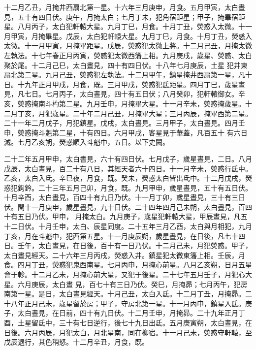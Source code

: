 \begin{pinyinscope}
 十二月乙丑，月掩井西扇北第一星。十六年三月庚申，月食。五月甲寅，太白晝見，五十有四日伏。庚午，月掩太白；七月丁未，犯角宿距星；甲子，掩畢宿距星。八月丙子，太白犯軒轅大星。九月丁巳，月食。十月丁丑，熒惑入太微。十一月甲寅，月掩畢星。戊辰，太白犯軒轅大星。九月丁巳，月食。十月丁丑，熒惑入太微。十一月甲寅，月掩畢距星。戊辰，熒惑犯太微上將。十二月己丑，月掩太微左執法。十七年春正月丙寅，熒惑犯太微西籓上相。九月庚戌，歲星、熒惑、太白聚於尾。十二月己巳，太白晝見，四十有四日伏。十八年七月庚辰，土星
 犯井東扇北第二星。九月己丑，熒惑犯左執法。十二月甲午，鎮星掩井西扇第一星，凡十日。十九年正月甲戌，月食，既。三月甲戌，熒惑犯氐距星。四月丁巳，歲星晝見，凡七日。七月丙子，太白晝見，四十有五日伏；八月癸卯，犯軒轅御女。辛亥，熒惑掩南斗杓第二星。九月壬申，月掩畢大星。十一月辛未，熒惑掩歲星。十二月丁亥，月犯歲星。二十年二月己丑，月掩畢大星；三月丙辰，掩畢西第二星。二十一年二月戊子，月犯鎮星。戊戌，太白晝見。三月甲子，太白晝見。四月壬申，熒惑掩斗魁第二星，十有四日。六月甲戌，客星見于華蓋，凡百五十
 有六日滅。七月乙亥朔，熒惑順入斗魁中，五日。以下史闕。



 二十二年五月甲申，太白書見，六十有四日伏。七月戊子，歲星晝見，二日。八月戊辰，太白晝見，百二十有八日，其經天者六十四日。十一月辛未，熒惑行氐中。乙亥，太白入氐。辛巳夜，月食，既。癸未，熒惑太白皆出氐中。十二月戊戌，熒惑犯鉤鈐。二十三年五月己卯，月食，既。九月甲申，歲星晝見，五十有五日伏。十月辛酉，太白晝見，百四十有九日乃伏。十一月丁卯，歲星晝見，三十有三日伏。閏十一月庚申，歲星晝見，九十日伏。二十四年四月己未朔，太白晝見，百四十有五日乃伏。甲申，
 月掩太白。九月庚子，歲星犯軒轅大星，甲辰晝見，凡五十二日伏。十月壬申，太白、辰星同度。二十五年三月乙酉，太白與月相犯，九月丁亥，月在斗魁中，犯西第五星。十一月庚辰朔，歲星晝見，在日後，凡七十四日。壬午，太白晝見，在日後，百十有一日乃伏。十二月己未，月犯熒惑。甲子，太白晝見經天。二十六年三月丙戌，熒惑入井。鎮星犯太微東籓上相。壬辰，月食。四月丁丑，熒惑犯鬼西南星。七月丙申，月掩心前星。八月乙亥朔，日月五星會于軫。十二月乙未，月掩心前大星，又犯于後星。二十七年五月壬子，月犯心大星。六月庚辰，太白晝
 見，百七十有三日乃伏。癸巳，月掩昴；七月丙午，犯房南第一星。是日，太白晝見經天。十月己丑，太白入氐。十二月丁丑，月掩昴。二十八年正月己未，歲星留於房；甲子，守房北第一星。十一月丙申，鎮星入氐。庚子，太白晝見，在日前，四十有九日伏。十二月壬申，月掩昴。二十九年正月丁酉，土星留氐中，三十有七日逆行，後七十九日出氐。五月庚寅朔，太白晝見，在日後。六月丙辰，月犯太白，月北星南，同在柳宿。十一月己未，熒惑守軒轅，至戊辰退行，其色稍怒。十二月辛丑，月食，既。




\end{pinyinscope}
